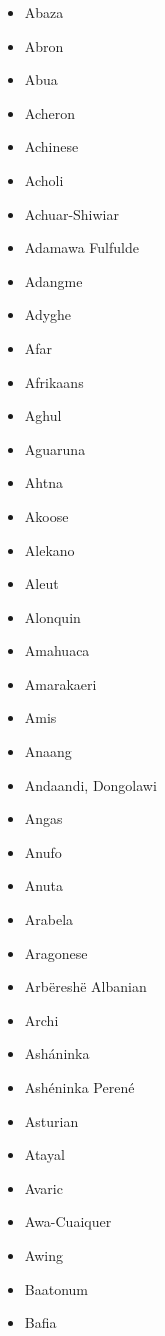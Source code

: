 \documentclass[paper=a4, 10pt]{scrbook}
\begin{document}
\begin{multicols}{3}
    \begin{itemize}
        \item Abaza
        \item Abron
        \item Abua
        \item Acheron
        \item Achinese
        \item Acholi
        \item Achuar-Shiwiar
        \item Adamawa Fulfulde
        \item Adangme
        \item Adyghe
        \item Afar
        \item Afrikaans
        \item Aghul
        \item Aguaruna
        \item Ahtna
        \item Akoose
        \item Alekano
        \item Aleut
        \item Alonquin
        \item Amahuaca
        \item Amarakaeri
        \item Amis
        \item Anaang
        \item Andaandi, Dongolawi
        \item Angas
        \item Anufo
        \item Anuta
        \item Arabela
        \item Aragonese
        \item Arbëreshë Albanian
        \item Archi
        \item Asháninka
        \item Ashéninka Perené
        \item Asturian
        \item Atayal
        \item Avaric
        \item Awa-Cuaiquer
        \item Awing
        \item Baatonum
        \item Bafia

\end{itemize}
\end{multicols}
\end{document}
